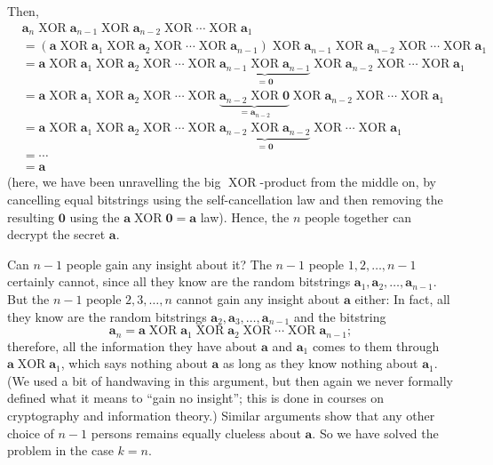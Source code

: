 \documentclass[numbers=enddot,12pt,final,onecolumn,notitlepage]{scrartcl}%
\numberwithin{exer}{subsection}
\theoremstyle{definition}
\begin{document}
Then,%
\begin{align*}
&  \mathbf{a}_{n}\operatorname*{XOR}\mathbf{a}_{n-1}\operatorname*{XOR}%
\mathbf{a}_{n-2}\operatorname*{XOR}\cdots\operatorname*{XOR}\mathbf{a}_{1}\\
&  =\left(  \mathbf{a}\operatorname*{XOR}\mathbf{a}_{1}\operatorname*{XOR}%
\mathbf{a}_{2}\operatorname*{XOR}\cdots\operatorname*{XOR}\mathbf{a}%
_{n-1}\right)  \operatorname*{XOR}\mathbf{a}_{n-1}\operatorname*{XOR}%
\mathbf{a}_{n-2}\operatorname*{XOR}\cdots\operatorname*{XOR}\mathbf{a}_{1}\\
&  =\mathbf{a}\operatorname*{XOR}\mathbf{a}_{1}\operatorname*{XOR}%
\mathbf{a}_{2}\operatorname*{XOR}\cdots\operatorname*{XOR}%
\underbrace{\mathbf{a}_{n-1}\operatorname*{XOR}\mathbf{a}_{n-1}}_{=\mathbf{0}%
}\operatorname*{XOR}\mathbf{a}_{n-2}\operatorname*{XOR}\cdots
\operatorname*{XOR}\mathbf{a}_{1}\\
&  =\mathbf{a}\operatorname*{XOR}\mathbf{a}_{1}\operatorname*{XOR}%
\mathbf{a}_{2}\operatorname*{XOR}\cdots\operatorname*{XOR}%
\underbrace{\mathbf{a}_{n-2}\operatorname*{XOR}\mathbf{0}}_{=\mathbf{a}_{n-2}%
}\operatorname*{XOR}\mathbf{a}_{n-2}\operatorname*{XOR}\cdots
\operatorname*{XOR}\mathbf{a}_{1}\\
&  =\mathbf{a}\operatorname*{XOR}\mathbf{a}_{1}\operatorname*{XOR}%
\mathbf{a}_{2}\operatorname*{XOR}\cdots\operatorname*{XOR}%
\underbrace{\mathbf{a}_{n-2}\operatorname*{XOR}\mathbf{a}_{n-2}}_{=\mathbf{0}%
}\operatorname*{XOR}\cdots\operatorname*{XOR}\mathbf{a}_{1}\\
&  =\cdots\\
&  =\mathbf{a}%
\end{align*}
(here, we have been unravelling the big $\operatorname*{XOR}$-product from the
middle on, by cancelling equal bitstrings using the self-cancellation law and
then removing the resulting $\mathbf{0}$ using the $\mathbf{a}%
\operatorname*{XOR}\mathbf{0}=\mathbf{a}$ law). Hence, the $n$ people together
can decrypt the secret $\mathbf{a}$.

Can $n-1$ people gain any insight about it? The $n-1$ people $1,2,\ldots,n-1$
certainly cannot, since all they know are the random bitstrings $\mathbf{a}%
_{1},\mathbf{a}_{2},\ldots,\mathbf{a}_{n-1}$. But the $n-1$ people
$2,3,\ldots,n$ cannot gain any insight about $\mathbf{a}$ either: In fact, all
they know are the random bitstrings $\mathbf{a}_{2},\mathbf{a}_{3}%
,\ldots,\mathbf{a}_{n-1}$ and the bitstring%
\[
\mathbf{a}_{n}=\mathbf{a}\operatorname*{XOR}\mathbf{a}_{1}\operatorname*{XOR}%
\mathbf{a}_{2}\operatorname*{XOR}\cdots\operatorname*{XOR}\mathbf{a}_{n-1};
\]
therefore, all the information they have about $\mathbf{a}$ and $\mathbf{a}%
_{1}$ comes to them through $\mathbf{a}\operatorname*{XOR}\mathbf{a}_{1}$,
which says nothing about $\mathbf{a}$ as long as they know nothing about
$\mathbf{a}_{1}$. (We used a bit of handwaving in this argument, but then
again we never formally defined what it means to \textquotedblleft gain no
insight\textquotedblright; this is done in courses on cryptography and
information theory.) Similar arguments show that any other choice of $n-1$
persons remains equally clueless about $\mathbf{a}$. So we have solved the
problem in the case $k=n$.
\end{document}
